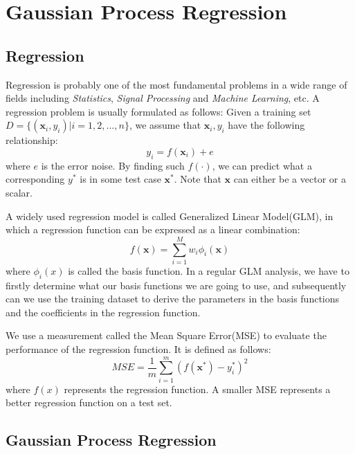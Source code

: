 \section{Gaussian Process Regression} \label{sec:intro}

\subsection{Regression}

Regression is probably one of the most fundamental problems in a wide range of fields including \emph{Statistics}, \emph{Signal Processing} and \emph{Machine Learning}, etc. A regression problem is usually formulated as follows:
Given a training set $D = \{ (\textbf{x}_{i}, y_{i}) | i = 1,2,...,n \}$, we assume that $\textbf{x}_{i}, y_{i}$ have the following relationship:
	\begin{equation}
		y_{i} = f(\textbf{x}_{i}) + e
	\end{equation}
where $e$ is the error noise. By finding such $f(\cdot)$, we can predict what a corresponding $y^{*}$ is in some test case $\textbf{x}^{*}$. Note that $\textbf{x}$ can either be a vector or a scalar.

A widely used regression model is called Generalized Linear Model(GLM)\cite{mccullagh1984generalized}, in which a regression function can be expressed as a linear combination:
	\begin{equation}
		f(\textbf{x}) = \sum_{i=1}^{M} w_{i}\phi_i (\textbf{x})
	\end{equation}
where $\phi_{i}(x)$ is called the basis function.
In a regular GLM analysis, we have to firstly determine what our basis functions we are going to use, and subsequently can we use the training dataset to derive the parameters in the basis functions and the coefficients in the regression function.
	
We use a measurement called the Mean Square Error(MSE) to evaluate the performance of the regression function. It is defined as follows:
	\begin{equation}
		MSE = \frac{1}{m}\sum^{m}_{i=1} (f(\textbf{x}^{*})-y_{i}^{*})^{2}
	\end{equation}
where $f(x)$ represents the regression function. A smaller MSE represents a better regression function on a test set.


\subsection{Gaussian Process Regression}

